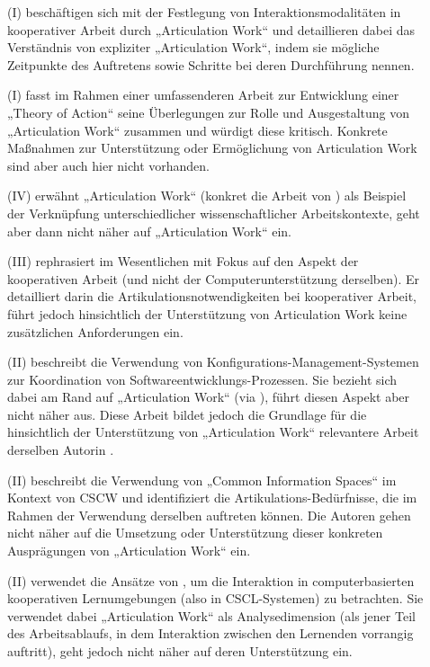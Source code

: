 \begin{description}
	\item[\citet{Corbin93}] (I) beschäftigen sich mit der Festlegung von Interaktionsmodalitäten in kooperativer Arbeit durch „Articulation Work“ und detaillieren dabei das Verständnis von expliziter „Articulation Work“, indem sie mögliche Zeitpunkte des Auftretens sowie Schritte bei deren Durchführung nennen.
	\item[\citet{Strauss93}] (I) fasst im Rahmen einer umfassenderen Arbeit zur Entwicklung einer „Theory of Action“ seine Überlegungen zur Rolle und Ausgestaltung von „Articulation Work“ zusammen und würdigt diese kritisch. Konkrete Maßnahmen zur Unterstützung oder Ermöglichung von Articulation Work sind aber auch hier nicht vorhanden.
	\item[\citet{Lenoir94}] (IV) erwähnt „Articulation Work“ (konkret die Arbeit von \citet{Fujimura87}) als Beispiel der Verknüpfung unterschiedlicher wissenschaftlicher Arbeitskontexte, geht aber dann nicht näher auf „Articulation Work“ ein.
	\item[\citet{Schmidt94}] (III) rephrasiert im Wesentlichen \citep{Schmidt90} mit Fokus auf den Aspekt der kooperativen Arbeit (und nicht der Computerunterstützung derselben). Er detailliert darin die Artikulationsnotwendigkeiten bei kooperativer Arbeit, führt jedoch hinsichtlich der Unterstützung von Articulation Work keine zusätzlichen Anforderungen ein.
	\item[\citet{Grinter95}] (II) beschreibt die Verwendung von Konfigurations-Management-Systemen zur Koordination von Softwareentwicklungs-Prozessen. Sie bezieht sich dabei am Rand auf „Articulation Work“ (via \citep{Schmidt92}), führt diesen Aspekt aber nicht näher aus. Diese Arbeit bildet jedoch die Grundlage für die hinsichtlich der Unterstützung von „Articulation Work“ relevantere Arbeit derselben Autorin \citep{Grinter96}.
	\item[\citet{Bannon97}] (II) beschreibt die Verwendung von „Common Information Spaces“ im Kontext von \gls{CSCW} und identifiziert die Artikulations-Bedürfnisse, die im Rahmen der Verwendung derselben auftreten können. Die Autoren gehen nicht näher auf die Umsetzung oder Unterstützung dieser konkreten Ausprägungen von „Articulation Work“ ein.
	\item[\citet{Fjuk97a}] (II) verwendet die Ansätze von \citet{Strauss93}, um die Interaktion in computerbasierten kooperativen Lernumgebungen (also in \gls{CSCL}-Systemen) zu betrachten. Sie verwendet dabei „Articulation Work“ als Analysedimension (als jener Teil des Arbeitsablaufs, in dem Interaktion zwischen den Lernenden vorrangig auftritt), geht jedoch nicht näher auf deren Unterstützung ein.

\end{description}
